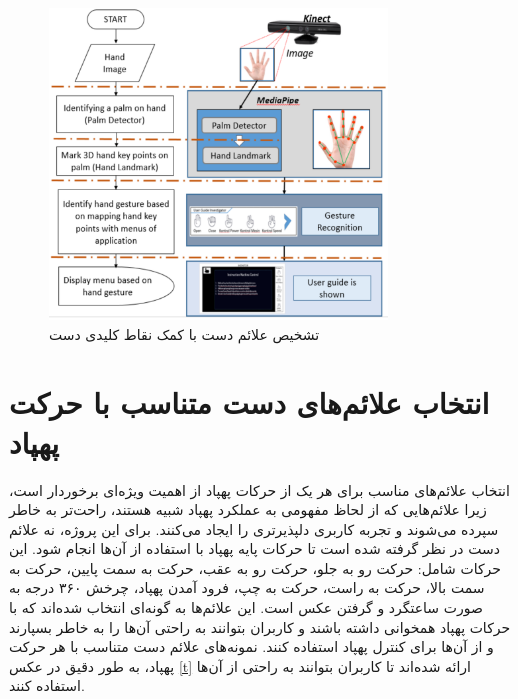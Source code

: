 \begin{figure}[h]
    \centering
    \includegraphics[width=0.8\textwidth]{gesture.png}
    \caption[تشخیص علائم دست با کمک نقاط کلیدی دست]{تشخیص علائم دست با کمک نقاط کلیدی دست \cite{li2012hand}}
\end{figure}



\section{انتخاب علائم‌های دست متناسب با حرکت پهپاد}
انتخاب علائم‌های مناسب برای هر یک از حرکات پهپاد از اهمیت ویژه‌ای برخوردار است، زیرا علائم‌هایی که از لحاظ مفهومی به عملکرد پهپاد شبیه هستند، راحت‌تر به خاطر سپرده می‌شوند و تجربه کاربری دلپذیرتری را ایجاد می‌کنند. برای این پروژه، نه علائم دست در نظر گرفته شده است تا حرکات پایه پهپاد با استفاده از آن‌ها انجام شود. 
این حرکات شامل: حرکت رو به جلو، حرکت رو به عقب، حرکت به سمت پایین، حرکت به سمت بالا،
حرکت به راست، حرکت به چپ، فرود آمدن پهپاد، چرخش ۳۶۰ درجه به صورت ساعتگرد و گرفتن عکس است.
این علائم‌ها به گونه‌ای انتخاب شده‌اند که با حرکات پهپاد همخوانی داشته باشند و کاربران بتوانند به راحتی آن‌ها را به خاطر بسپارند و از آن‌ها برای کنترل پهپاد استفاده کنند. نمونه‌های علائم دست متناسب با هر حرکت پهپاد، به طور دقیق در عکس \ref{t} ارائه شده‌اند تا کاربران بتوانند به راحتی از آن‌ها استفاده کنند.


